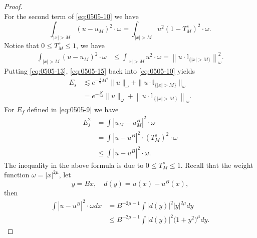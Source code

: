 \documentclass[10pt,a4paper]{amsart}
\begin{document}
\begin{proof}
\begin{equation}
  \end{equation}
  For the second term of \eqref{eq:0505-10} we have
  \begin{equation}\label{eq:0505-14}
    \int_{|x|>M}\left(u-u_M\right)^2 \cdot \omega=\int_{|x|>M} u^2\left(1-T_M^s\right)^2 \cdot \omega.
  \end{equation}
  Notice that $0 \leqslant T_M^s \leqslant 1$, we have
  \begin{equation}\label{eq:0505-15}
    \begin{aligned}
    \int_{|x|>M}\left(u-u_M\right)^2 \cdot \omega & \leqslant \int_{|x|>M} u^2 \cdot \omega 
     =\left\|u \cdot \mathbb{I}_{\{|x|>M\}}\right\|_\omega^2.
    \end{aligned}
  \end{equation}
  Putting \eqref{eq:0505-13}, \eqref{eq:0505-15} back into \eqref{eq:0505-10}
  yields
  \begin{equation}\label{eq:0505-16}
    \begin{aligned}
    E_s & \lesssim e^{-\frac{1}{2} M^2}\|u\|_\omega+\|u \cdot \mathbb{I}_{\{|x|>M\}}\|_\omega \\
    & =e^{-\frac{N}{24}}\|u\|_\omega+\left\|u \cdot \mathbb{I}_{\left\{|x|>M\right\}}\right\|_\omega.
    \end{aligned}
  \end{equation}
  For $E_f$ defined in \eqref{eq:0505-9} we have
  \begin{equation}\label{eq:0505-17}
    \begin{aligned}
    E_f^2 & =\int\left|u_M-u_M^B\right|^2 \cdot \omega \\
    & =\int\left|u-u^B\right|^2 \cdot\left(T_M^s\right)^2 \cdot \omega \\
    & \leqslant \int\left|u-u^B\right|^2 \cdot \omega.
    \end{aligned}
  \end{equation}
  The inequality in the above formula is due to $0 \leqslant T_M^s \leqslant 1$.
  Recall that the weight function $\omega = |x|^{2\mu}$, let
  \begin{equation}\label{eq:1111-0.5}
    y=B x, \quad d(y)=u(x)-u^B(x),
  \end{equation}
  then 
  \begin{equation}\label{eq:1111-1}
    \begin{aligned}
     \int\left|u-u^B\right|^2 \cdot \omega d x 
    &=  B^{-2 \mu-1} \int|d(y)|^2|y|^{2 \mu} d y \\
    &\leqslant  B^{-2 \mu-1} \int|d(y)|^2\bigl(1+y^2\bigr)^\mu d y.

\end{aligned}
\end{equation}
\end{proof}
\end{document}
